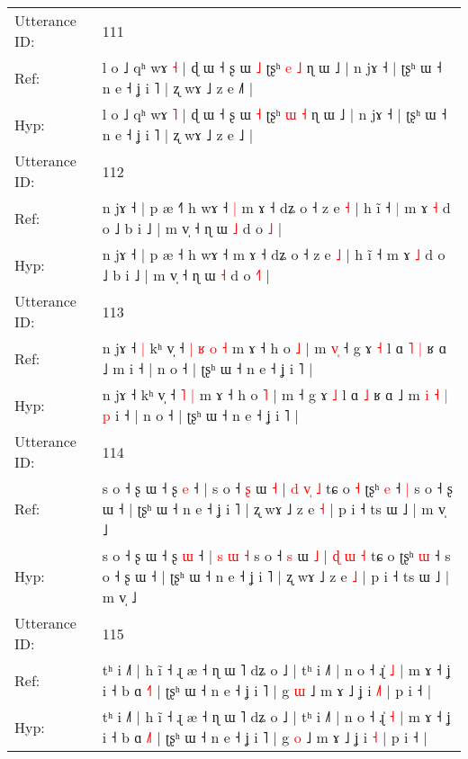 \documentclass[10pt]{article}
\DeclareRobustCommand{\hl}[1]{{\textcolor{red}{#1}}}
\begin{document}
\begin{longtable}{ll}
 \\
\midrule
Utterance ID: & 111 \\
Ref: & l o ˩ qʰ wɤ \hl{˧} | ɖ ɯ ˧ ʂ ɯ \hl{˩} ʈʂʰ \hl{e} \hl{˩} ɳ ɯ ˩ | n jɤ ˧ | ʈʂʰ ɯ ˧ n e ˧ ʝ i ˥ | ʐ wɤ ˩ z e ˩\hl{˥} |
 \\
Hyp: & l o ˩ qʰ wɤ \hl{˥} | ɖ ɯ ˧ ʂ ɯ \hl{˧} ʈʂʰ \hl{ɯ} \hl{˧} ɳ ɯ ˩ | n jɤ ˧ | ʈʂʰ ɯ ˧ n e ˧ ʝ i ˥ | ʐ wɤ ˩ z e ˩\hl{} |
 \\
\midrule
Utterance ID: & 112 \\
Ref: & n jɤ ˧ | p æ ˧\hl{˥} h wɤ ˧\hl{ }\hl{|} m ɤ ˧ dʑ o ˧ z e \hl{˧} | h ĩ ˧\hl{ }\hl{|} m ɤ \hl{˧} d o ˩ b i ˩ | m v̩ ˧ ɳ ɯ \hl{˩} d o \hl{}\hl{˩} |
 \\
Hyp: & n jɤ ˧ | p æ ˧\hl{} h wɤ ˧\hl{}\hl{} m ɤ ˧ dʑ o ˧ z e \hl{˩} | h ĩ ˧\hl{}\hl{} m ɤ \hl{˩} d o ˩ b i ˩ | m v̩ ˧ ɳ ɯ \hl{˧} d o \hl{˧}\hl{˥} |
 \\
\midrule
Utterance ID: & 113 \\
Ref: & n jɤ ˧\hl{ }\hl{|} kʰ v̩ ˧\hl{ }\hl{|}\hl{ }\hl{ʁ} \hl{o} \hl{˧} m ɤ ˧ h o \hl{˩} | m\hl{ }\hl{v}\hl{̩} ˧ g ɤ \hl{˧} l ɑ\hl{ }\hl{˥} \hl{|} ʁ ɑ ˩ m\hl{}\hl{}\hl{}\hl{}\hl{}\hl{}\hl{}\hl{} i ˧ | n o ˧ | ʈʂʰ ɯ ˧ n e ˧ ʝ i ˥ |
 \\
Hyp: & n jɤ ˧\hl{}\hl{} kʰ v̩ ˧\hl{}\hl{}\hl{}\hl{} \hl{˥} \hl{|} m ɤ ˧ h o \hl{˥} | m\hl{}\hl{}\hl{} ˧ g ɤ \hl{˩} l ɑ\hl{}\hl{} \hl{˩} ʁ ɑ ˩ m\hl{ }\hl{i}\hl{ }\hl{˧}\hl{ }\hl{|}\hl{ }\hl{p} i ˧ | n o ˧ | ʈʂʰ ɯ ˧ n e ˧ ʝ i ˥ |
 \\
\midrule
Utterance ID: & 114 \\
Ref: & s o ˧ ʂ ɯ ˧ ʂ \hl{e} ˧ |\hl{}\hl{}\hl{}\hl{}\hl{}\hl{} s o ˧ \hl{ʂ} ɯ \hl{˧} | \hl{d} \hl{v}\hl{̩} \hl{˩} tɕ o\hl{ }\hl{˧} ʈʂʰ \hl{e} ˧\hl{ }\hl{|} s o ˧ ʂ ɯ ˧ | ʈʂʰ ɯ ˧ n e ˧ ʝ i ˥ | ʐ wɤ ˩ z e \hl{˧} | p i ˧ ts ɯ ˩ | m v̩ ˩
 \\
Hyp: & s o ˧ ʂ ɯ ˧ ʂ \hl{ɯ} ˧ |\hl{ }\hl{s}\hl{ }\hl{ɯ}\hl{ }\hl{˧} s o ˧ \hl{s} ɯ \hl{˩} | \hl{ɖ} \hl{}\hl{ɯ} \hl{˧} tɕ o\hl{}\hl{} ʈʂʰ \hl{ɯ} ˧\hl{}\hl{} s o ˧ ʂ ɯ ˧ | ʈʂʰ ɯ ˧ n e ˧ ʝ i ˥ | ʐ wɤ ˩ z e \hl{˩} | p i ˧ ts ɯ ˩ | m v̩ ˩
 \\
\midrule
Utterance ID: & 115 \\
Ref: & tʰ i ˩˥ | h ĩ ˧ ɻ æ ˧ ɳ ɯ ˥ dʑ o ˩ | tʰ i ˩˥ | n o ˧ ɻ̍ \hl{˩} | m ɤ ˧ ʝ i ˧ b ɑ \hl{˧}˥ | ʈʂʰ ɯ ˧ n e ˧ ʝ i ˥ | g \hl{ɯ} ˩ m ɤ ˩ ʝ i \hl{˩}\hl{˥} | p i ˧ |
 \\
Hyp: & tʰ i ˩˥ | h ĩ ˧ ɻ æ ˧ ɳ ɯ ˥ dʑ o ˩ | tʰ i ˩˥ | n o ˧ ɻ̍ \hl{˧} | m ɤ ˧ ʝ i ˧ b ɑ \hl{˩}˥ | ʈʂʰ ɯ ˧ n e ˧ ʝ i ˥ | g \hl{o} ˩ m ɤ ˩ ʝ i \hl{}\hl{˧} | p i ˧ |

\end{longtable}
\end{document}
